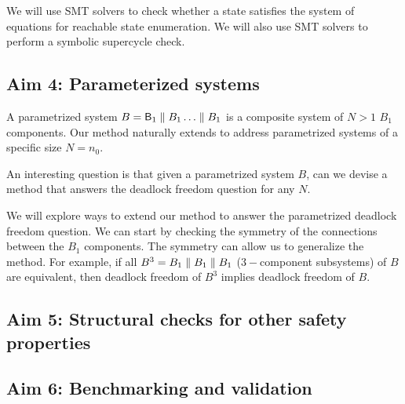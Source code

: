 We will use SMT solvers to check whether a state 
satisfies the system of equations for reachable state 
enumeration. 
We will also use SMT solvers to perform a symbolic
supercycle check.

\subsection{Aim 4: Parameterized systems} 

A parametrized system $B=\mathsf{B}_1 \parallel B_1 \ldots \parallel B_1$ is a 
composite system of $N>1$ $B_1$ components. 
Our method naturally extends to address parametrized systems 
of a specific size $N=n_0$. 

An interesting question is that given a parametrized system $B$, 
can we devise a method that answers the deadlock freedom
question for any $N$. 

We will explore ways to extend our method to answer the 
parametrized deadlock freedom question. 
We can start by checking the symmetry of the connections between
the $B_1$ components.
The symmetry can allow us to generalize the method. 
For example, if all $B^3=B_1\parallel B_1 \parallel B_1$ 
($3-$component subsystems) of $B$ are equivalent,
then deadlock freedom of $B^3$ implies deadlock freedom 
of $B$. 


\subsection{Aim 5: Structural checks for other safety properties} 
\subsection{Aim 6: Benchmarking and validation } 

